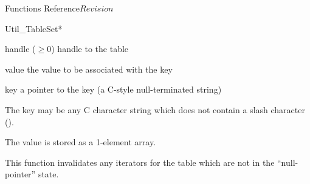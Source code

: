 \begin{cactuspart}{ Functions Reference}{}{$Revision$}
\begin{FunctionDescription}{Util\_TableSet*}
\begin{ParameterSection}
\begin{Parameter}{handle ($\ge 0$)}
handle to the table
\end{Parameter}
\begin{Parameter}{value}
the value to be associated with the key
\end{Parameter}
\begin{Parameter}{key}
a pointer to the key (a C-style null-terminated string)
\end{Parameter}
\end{ParameterSection}

\begin{Discussion}
The key may be any C character string which does not contain a slash
character ().

The value is stored as a 1-element array.

This function invalidates any iterators for the table which are
not in the ``null-pointer'' state.
\end{Discussion}


\end{FunctionDescription}
\end{cactuspart}
